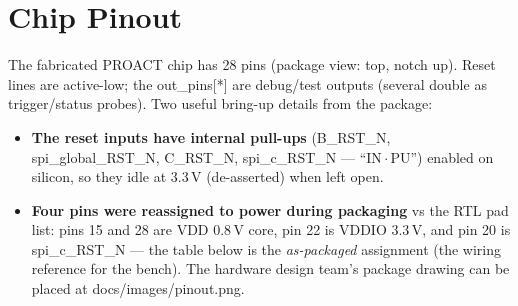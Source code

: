 \documentclass[11pt,a4paper]{report}
\newcommand{\code}[1]{{\ttfamily\small #1}}
\begin{document}
\chapter{Chip Pinout}
The fabricated PROACT chip has 28 pins (package view: top, notch up). Reset lines
are active-low; the \code{out\_pins[*]} are debug/test outputs (several double as
trigger/status probes). Two useful bring-up details from the package:
\begin{itemize}[nosep,leftmargin=1.4em]
\item \textbf{The reset inputs have internal pull-ups} (\code{B\_RST\_N},
\code{spi\_global\_RST\_N}, \code{C\_RST\_N}, \code{spi\_c\_RST\_N} --- ``IN\,$\cdot$\,PU'')
enabled on silicon, so they idle at 3.3\,V (de-asserted) when left open.
\item \textbf{Four pins were reassigned to power during packaging} vs the RTL pad
list: pins 15 and 28 are \code{VDD} 0.8\,V core, pin 22 is \code{VDDIO} 3.3\,V,
and pin 20 is \code{spi\_c\_RST\_N} --- the table below is the \emph{as-packaged}
assignment (the wiring reference for the bench). The hardware design team's
package drawing can be placed at \code{docs/images/pinout.png}.
\end{itemize}
\end{document}
